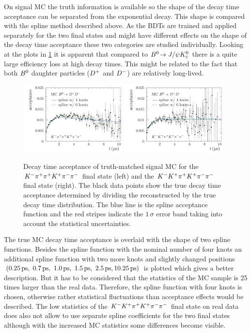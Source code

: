 On signal MC the truth information is available so the shape of the decay time
acceptance can be separated from the exponential decay. This shape is compared
with the spline method described above. As the BDTs are trained and applied
separately for the two final states and might have different effects on the
shape of the decay time acceptance these two categories are studied
individually. Looking at the plots in
\cref{fig:b02dd:decaytimefit:acceptance_MC} it is apparent that compared to
${{B}^0}\!\rightarrow J/\psi{\ensuremath{{K}^0_{\mathrm{ \scriptscriptstyle S}}}}$ there is a quite large efficiency loss at high decay times. This
might be related to the fact that both ${{B}^0}$ daughter particles (${{D}^+}$ and
${{D}^-}$) are relatively long-lived.
%
\begin{figure}[tb]
\centering
\includegraphics[width=0.48\textwidth]{07-B02DD/tikz/pdf/Acceptancespline_nolog_MC_Kpipi.pdf}
\includegraphics[width=0.48\textwidth]{07-B02DD/tikz/pdf/Acceptancespline_nolog_MC_KKpi.pdf}
\caption{Decay time acceptance of truth-matched signal MC for the ${{K}^-}{{\pi}^+}{{\pi}^+}{{K}^+}{{\pi}^-}{{\pi}^-}$
final state (left) and the ${{K}^-}{{K}^+}{{\pi}^+}{{K}^+}{{\pi}^-}{{\pi}^-}$ final state (right). The black data
points show the true decay time acceptance determined by dividing the
reconstructed by the true decay time distribution. The blue line is the spline
acceptance function and the red stripes indicate the $1\,\sigma$ error band
taking into account the statistical uncertainties.}
\label{fig:b02dd:decaytimefit:acceptance_MC}
\end{figure}
%
The true MC decay time acceptance is overlaid with the shape of two spline
functions. Besides the spline function with the nominal number of four knots
an additional spline function with two more knots and slightly changed
positions $(\SIlist[list-final-separator={,
}]{0.25;0.7;1.0;1.5;2.5;10.25}{\ps})$ is plotted which gives a better
description. But it has to be considered that the statistics of the MC sample
is \num{25} times larger than the real data. Therefore, the spline function
with four knots is chosen, otherwise rather statistical fluctuations than
acceptance effects would be described. The low statistics of the ${{K}^-}{{K}^+}{{\pi}^+}{{K}^+}{{\pi}^-}{{\pi}^-}$
final state on real data does also not allow to use separate spline
coefficients for the two final states although with the increased MC
statistics some differences become visible.
